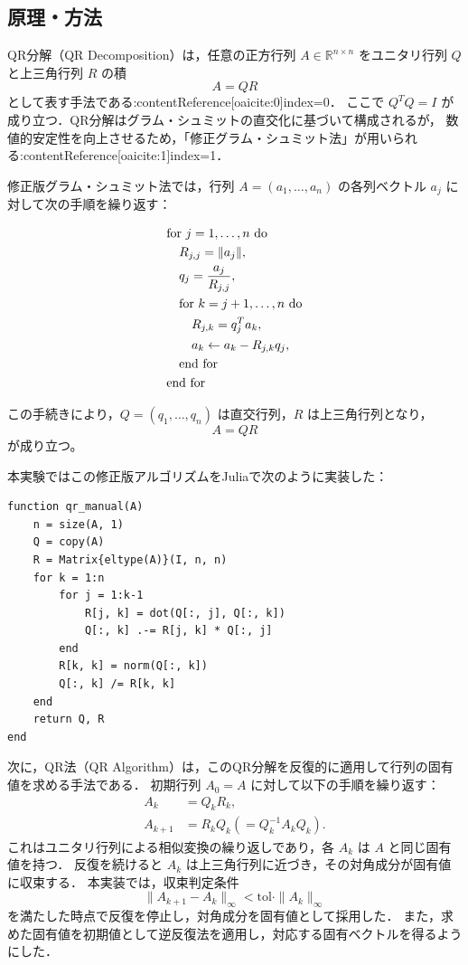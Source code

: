 \documentclass[a4paper,11pt]{ltjsarticle}
\begin{document}
\subsection{原理・方法}

QR分解（QR Decomposition）は，任意の正方行列 $A \in \mathbb{R}^{n\times n}$ をユニタリ行列 $Q$ と上三角行列 $R$ の積
\[
A = QR
\]
として表す手法である:contentReference[oaicite:0]{index=0}．
ここで $Q^TQ = I$ が成り立つ．QR分解はグラム・シュミットの直交化に基づいて構成されるが，
数値的安定性を向上させるため，「修正グラム・シュミット法」が用いられる:contentReference[oaicite:1]{index=1}．

修正版グラム・シュミット法では，行列 $A = (a_1, \ldots, a_n)$ の各列ベクトル $a_j$ に対して次の手順を繰り返す：

\begin{align}
&\text{for } j = 1, \ldots, n \text{ do} \notag\\
&\quad R_{j,j} = \|a_j\|, \\
&\quad q_j = \frac{a_j}{R_{j,j}}, \\
&\quad \text{for } k = j+1, \ldots, n \text{ do} \notag\\
&\qquad R_{j,k} = q_j^T a_k, \\
&\qquad a_k \leftarrow a_k - R_{j,k} q_j, \\
&\quad \text{end for} \notag\\
&\text{end for} \notag
\end{align}

この手続きにより，$Q = (q_1, \ldots, q_n)$ は直交行列，$R$ は上三角行列となり，
\[
A = QR
\]
が成り立つ。

本実験ではこの修正版アルゴリズムをJuliaで次のように実装した：

\begin{verbatim}
function qr_manual(A)
    n = size(A, 1)
    Q = copy(A)
    R = Matrix{eltype(A)}(I, n, n)
    for k = 1:n
        for j = 1:k-1
            R[j, k] = dot(Q[:, j], Q[:, k])
            Q[:, k] .-= R[j, k] * Q[:, j]
        end
        R[k, k] = norm(Q[:, k])
        Q[:, k] /= R[k, k]
    end
    return Q, R
end
\end{verbatim}

次に，QR法（QR Algorithm）は，このQR分解を反復的に適用して行列の固有値を求める手法である．
初期行列 $A_0 = A$ に対して以下の手順を繰り返す：
\begin{align}
A_k &= Q_k R_k, \\
A_{k+1} &= R_k Q_k (= Q_k^{-1} A_k Q_k).
\end{align}
これはユニタリ行列による相似変換の繰り返しであり，各 $A_k$ は $A$ と同じ固有値を持つ．
反復を続けると $A_k$ は上三角行列に近づき，その対角成分が固有値に収束する．
本実装では，収束判定条件
\[
\|A_{k+1} - A_k\|_{\infty} < \mathrm{tol} \cdot \|A_k\|_{\infty}
\]
を満たした時点で反復を停止し，対角成分を固有値として採用した．
また，求めた固有値を初期値として逆反復法を適用し，対応する固有ベクトルを得るようにした．
\end{document}
